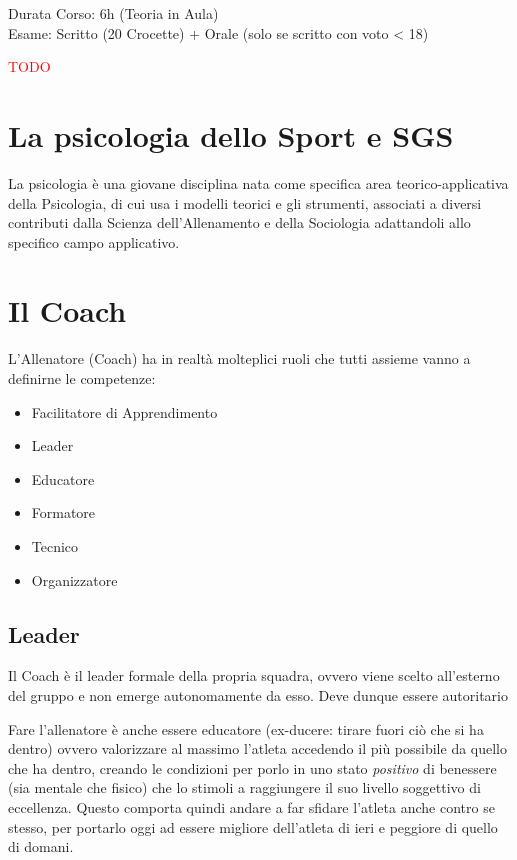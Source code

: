 \documentclass[../uefaC.tex]{subfiles}
\begin{document}

Durata Corso: 6h (Teoria in Aula) \hfill \\
Esame: Scritto (20 Crocette) + Orale (solo se scritto con voto < 18)

\textcolor{red}{TODO}

\section{La psicologia dello Sport e SGS}

La psicologia è una giovane disciplina nata come specifica area teorico-applicativa della Psicologia, di cui usa i modelli teorici e gli strumenti, associati a diversi contributi dalla Scienza dell'Allenamento e della Sociologia adattandoli allo specifico campo applicativo.

\section{Il Coach}
L'Allenatore (Coach) ha in realtà molteplici ruoli che tutti assieme vanno a definirne le competenze:
\begin{itemize}
    \item Facilitatore di Apprendimento
    \item Leader
    \item Educatore
    \item Formatore
    \item Tecnico
    \item Organizzatore
\end{itemize}

\subsection{Leader}
Il Coach è il leader formale della propria squadra, ovvero viene scelto all'esterno del gruppo e non emerge autonomamente da esso. Deve dunque essere autoritario 

Fare l'allenatore è anche essere educatore (ex-ducere: tirare fuori ciò che si ha dentro) ovvero valorizzare al massimo l'atleta accedendo il più possibile da quello che ha dentro, creando le condizioni per porlo in uno stato \emph{positivo} di benessere (sia mentale che fisico) che lo stimoli a raggiungere il suo livello soggettivo di eccellenza. Questo comporta quindi andare a far sfidare l'atleta anche contro se stesso, per portarlo oggi ad essere migliore dell'atleta di ieri e peggiore di quello di domani. \hfill \\
\end{document}
